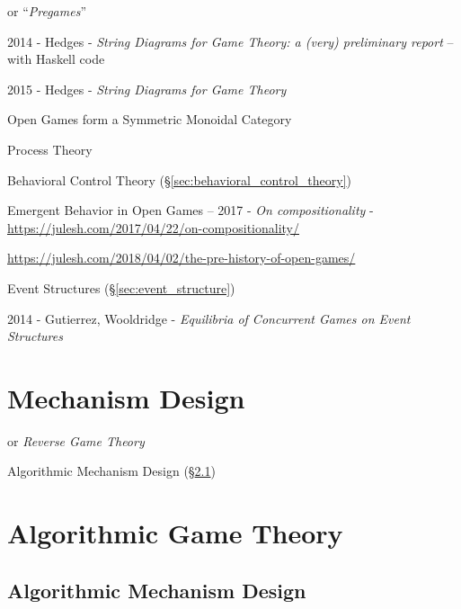 or ``\emph{Pregames}''

2014 - Hedges - \emph{String Diagrams for Game Theory: a (very) preliminary
  report} -- with Haskell code

2015 - Hedges - \emph{String Diagrams for Game Theory}

Open Games form a Symmetric Monoidal Category

Process Theory

Behavioral Control Theory (\S\ref{sec:behavioral_control_theory})

Emergent Behavior in Open Games --
2017 - \emph{On compositionality} -
\url{https://julesh.com/2017/04/22/on-compositionality/}

\url{https://julesh.com/2018/04/02/the-pre-history-of-open-games/}

Event Structures (\S\ref{sec:event_structure})

2014 - Gutierrez, Wooldridge - \emph{Equilibria of Concurrent Games on Event
  Structures}



\section{Mechanism Design}\label{sec:mechanism_design}

or \emph{Reverse Game Theory}

Algorithmic Mechanism Design (\S\ref{sec:algorithmic_mechanism_design})



\section{Algorithmic Game Theory}\label{sec:algorithmic_game_theory}

\subsection{Algorithmic Mechanism Design}
\label{sec:algorithmic_mechanism_design}



